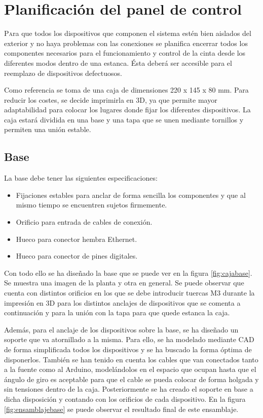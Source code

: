 \chapter{Planificación del panel de control}\label{chp-04}

\lettrine[lraise=-0.1, lines=2, loversize=0.2]{P}ara que todos los dispositivos que componen el sistema estén bien aislados del exterior y no haya problemas con las conexiones se planifica encerrar todos los componentes necesarios para el funcionamiento y control de la cinta desde los diferentes modos dentro de una estanca. Ésta deberá ser accesible para el reemplazo de dispositivos defectuosos.

Como referencia se toma de una caja de dimensiones 220 x 145 x 80 mm. Para reducir los 
costes, se decide imprimirla en 3D, ya que permite mayor adaptabilidad para colocar 
los lugares donde fijar los diferentes dispositivos. La caja estará dividida en una base y una 
tapa que se unen mediante tornillos y permiten una unión estable.

\section{Base}

La base debe tener las siguientes especificaciones:
\begin{itemize}
    \item Fijaciones estables para anclar de forma sencilla los componentes y que al mismo tiempo se encuentren sujetos firmemente. 
    \item Orificio para entrada de cables de conexión.
    \item Hueco para conector hembra Ethernet.
    \item Hueco para conector de pines digitales.
\end{itemize} 

Con todo ello se ha diseñado la base que se puede ver en la figura \ref{fig:cajabase}. Se muestra
una imagen de la planta y otra en general. Se puede observar que cuenta con distintos orificios en los
que se debe introducir tuercas M3 durante la impresión en 3D para los distintos anclajes de dispositivos
que se comenta a continuación y para la unión con la tapa para que quede estanca la caja.

Además, para el anclaje de los dispositivos sobre la base, se ha diseñado un soporte que va atornillado a la misma. Para ello, se ha modelado mediante CAD de forma simplificada todos los dispositivos y se ha buscado la forma óptima de disponerlos. También se han tenido en cuenta los cables que van conectados tanto a la fuente como al Arduino, modelándolos en el espacio que ocupan hasta que el ángulo de giro es aceptable para que el cable se pueda colocar de forma holgada y sin tensiones dentro de la caja. Posteriormente se ha creado el soporte en base a dicha disposición y contando con los orificios de cada dispositivo. En la figura \ref{fig:ensamblajebase} se puede observar el resultado final de este ensamblaje.

